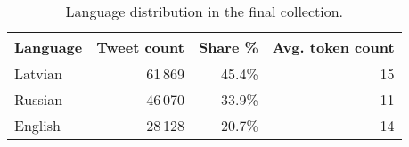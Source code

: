 \begin{table}[ht]
  \centering
  \small
  \begin{tabular}{lrrr}
    \toprule
    Language & Tweet count & Share \% & Avg. token count \\
    \midrule
    Latvian     & 61\,869  & 45.4\% & 15 \\
    Russian     & 46\,070  & 33.9\% & 11 \\
    English     & 28\,128  & 20.7\% & 14 \\
    \bottomrule
  \end{tabular}
  \caption{Language distribution in the final collection.}
  \label{tab:language-counts}
\end{table}